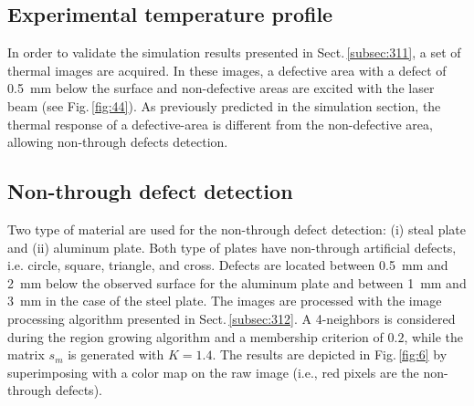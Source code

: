 \documentclass[12pt]{spieman}
\begin{document}
\begin{spacing}{2}
\subsection{Experimental temperature profile}\label{subsec:42}

In order to validate the simulation results presented in Sect.\,\ref{subsec:311}, a set of thermal images are acquired. 
In these images, a defective area with a defect of \SI{0.5}{\milli \metre} below the surface and non-defective areas are excited with the laser beam (see Fig.\,\ref{fig:44}).
As previously predicted in the simulation section, the thermal response of a defective-area is different from the non-defective area, allowing non-through defects detection.

\subsection{Non-through defect detection}


Two type of material are used for the non-through defect detection: (i) steal plate and (ii) aluminum plate.
Both type of plates have non-through artificial defects, i.e. circle, square, triangle, and cross.
Defects are located between \SI{0.5}{\milli \metre} and \SI{2}{\milli \metre} below the observed surface for the aluminum plate and between \SI{1}{\milli \metre} and \SI{3}{\milli \metre} in the case of the steel plate.
The images are processed with the image processing algorithm presented in Sect.\,\ref{subsec:312}.
A 4-neighbors is considered during the region growing algorithm and a membership criterion of $0.2$, while the matrix $s_m$ is generated with $K=1.4$.
The results are depicted in Fig.\,\ref{fig:6} by superimposing with a color map on the raw image (i.e., red pixels are the non-through defects).

	




\end{spacing}
\end{document}
